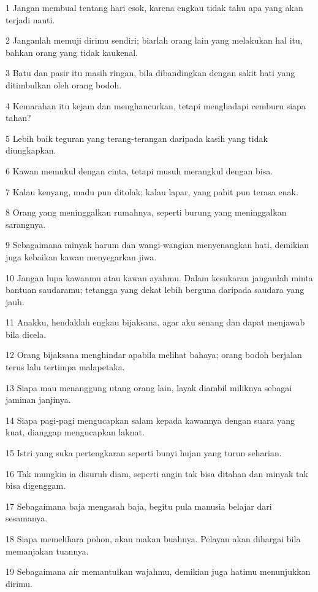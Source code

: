 \par 1 Jangan membual tentang hari esok, karena engkau tidak tahu apa yang akan terjadi nanti.
\par 2 Janganlah memuji dirimu sendiri; biarlah orang lain yang melakukan hal itu, bahkan orang yang tidak kaukenal.
\par 3 Batu dan pasir itu masih ringan, bila dibandingkan dengan sakit hati yang ditimbulkan oleh orang bodoh.
\par 4 Kemarahan itu kejam dan menghancurkan, tetapi menghadapi cemburu siapa tahan?
\par 5 Lebih baik teguran yang terang-terangan daripada kasih yang tidak diungkapkan.
\par 6 Kawan memukul dengan cinta, tetapi musuh merangkul dengan bisa.
\par 7 Kalau kenyang, madu pun ditolak; kalau lapar, yang pahit pun terasa enak.
\par 8 Orang yang meninggalkan rumahnya, seperti burung yang meninggalkan sarangnya.
\par 9 Sebagaimana minyak harum dan wangi-wangian menyenangkan hati, demikian juga kebaikan kawan menyegarkan jiwa.
\par 10 Jangan lupa kawanmu atau kawan ayahmu. Dalam kesukaran janganlah minta bantuan saudaramu; tetangga yang dekat lebih berguna daripada saudara yang jauh.
\par 11 Anakku, hendaklah engkau bijaksana, agar aku senang dan dapat menjawab bila dicela.
\par 12 Orang bijaksana menghindar apabila melihat bahaya; orang bodoh berjalan terus lalu tertimpa malapetaka.
\par 13 Siapa mau menanggung utang orang lain, layak diambil miliknya sebagai jaminan janjinya.
\par 14 Siapa pagi-pagi mengucapkan salam kepada kawannya dengan suara yang kuat, dianggap mengucapkan laknat.
\par 15 Istri yang suka pertengkaran seperti bunyi hujan yang turun seharian.
\par 16 Tak mungkin ia disuruh diam, seperti angin tak bisa ditahan dan minyak tak bisa digenggam.
\par 17 Sebagaimana baja mengasah baja, begitu pula manusia belajar dari sesamanya.
\par 18 Siapa memelihara pohon, akan makan buahnya. Pelayan akan dihargai bila memanjakan tuannya.
\par 19 Sebagaimana air memantulkan wajahmu, demikian juga hatimu menunjukkan dirimu.
